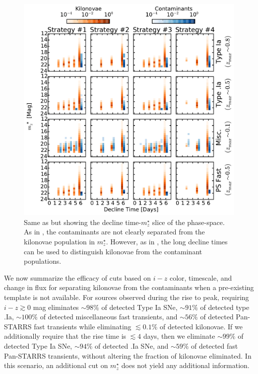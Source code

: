\begin{figure}[t!]
\centering
\includegraphics[width=\textwidth]{./figs/chapter2/ch2_f17.pdf}
\caption{Same as  but showing the decline time-$m^{\star}_z$ slice of the phase-space. As in , the contaminants are not clearly separated from the kilonovae population in $m^{\star}_z$. However, as in , the long decline times can be used to distinguish kilonovae from the contaminant populations.}
\label{fig:ch2_phasedecdiff_df}
\end{figure}

We now summarize the efficacy of cuts based on $i-z$ color, timescale, and change in flux for separating kilonovae from the contaminants when a pre-existing template is not available. For sources observed during the rise to peak, requiring $i-z\gtrsim0$ mag eliminates $\sim98\%$ of detected Type Ia SNe, $\sim91\%$ of detected type .Ia, $\sim100\%$ of detected miscellaneous fast transients, and $\sim 56\%$ of detected Pan-STARRS fast transients while eliminating $\lesssim0.1\%$ of detected kilonovae. If we additionally require that the rise time is $\lesssim4$ days, then we eliminate $\sim99\%$ of detected Type Ia SNe, $\sim94\%$ of detected .Ia SNe, and $\sim59\%$ of detected fast Pan-STARRS transients, without altering the fraction of kilonovae eliminated. In this scenario, an additional cut on $m^{\star}_z$ does not yield any additional information.

